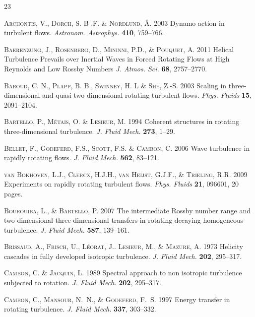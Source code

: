 \documentclass[aps,amsmath,amssymb,floatfix,showpacs]{revtex4}
\begin{document}

\begin{thebibliography}{23}

\textsc{Archontis, V., Dorch, S. B .F. \&  Nordlund, \AA.}
2003 Dynamo action in turbulent flows.
\emph{Astronom. Astrophys.} \textbf{410}, 759--766.

\textsc{Baerenzung, J., Rosenberg, D., Mininni, P.D., \& Pouquet, A.}
2011 Helical Turbulence Prevails over Inertial Waves in Forced Rotating Flows at High Reynolds and Low Rossby Numbers
\emph{J. Atmos. Sci.} \textbf{68}, 2757--2770.

\textsc{Baroud, C. N., Plapp, B. B., Swinney, H. L \& She, Z.-S.}
2003 Scaling in three-dimensional and quasi-two-dimensional rotating turbulent flows.
\emph{Phys. Fluids} \textbf{15}, 2091--2104.

\textsc{Bartello, P., M\'etais, O. \&  Lesieur, M.} 
1994 Coherent structures in rotating three-dimensional turbulence.
\emph{J. Fluid Mech.} \textbf{273}, 1--29.

\textsc{Bellet, F., Godeferd, F.S., Scott, F.S. \& Cambon, C.} 
2006 Wave turbulence in rapidly rotating flows.
\emph{J. Fluid Mech.} \textbf{562}, 83--121.

\textsc{van Bokhoven, L.J., Clercx, H.J.H., van Heijst, G.J.F., \& Trieling, R.R.}
2009  Experiments on rapidly rotating turbulent flows.
\emph{Phys. Fluids}
\textbf{21}, 096601, 20 pages.

\textsc{Bourouiba, L., \& Bartello, P.}
2007 The intermediate Rossby number range and two-dimensional-three-dimensional transfers in rotating decaying homogeneous turbulence.
\emph{J. Fluid Mech.} \textbf{587}, 139--161.

 \textsc{Brissaud, A., Frisch, U., L\'eorat, J.. Lesieur, M., \& Mazure, A.}
1973 Helicity cascades in fully developed isotropic turbulence.
 \emph{J. Fluid Mech.} \textbf{202}, 295--317.

\textsc{Cambon, C. \& Jacquin, L.}
1989 Spectral approach to non isotropic turbulence subjected to rotation.
\emph{J. Fluid Mech.} \textbf{202}, 295--317.

\textsc{Cambon, C., Mansour, N.~N., \& Godeferd, F.~S.}
1997 Energy transfer in rotating turbulence.
\emph {J. Fluid Mech.} \textbf{337}, 303--332.


\end{thebibliography}
\end{document}
